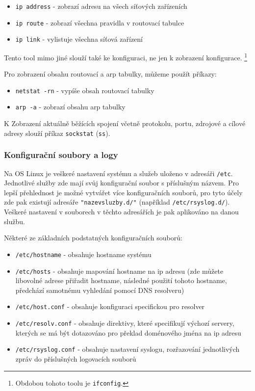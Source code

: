 \begin{itemize}
				\item \texttt{ip address} - zobrazí adresu na všech síťových zařízeních
				\item \texttt{ip route} - zobrazí všechna pravidla v routovací tabulce
				\item \texttt{ip link} - vylistuje všechna síťová zařízení
\end{itemize}

Tento tool mimo jiné slouží také ke konfiguraci, ne jen k zobrazení konfigurace. \footnote{Obdobou tohoto toolu je \texttt{ifconfig}.}


Pro zobrazení obsahu routovací a arp tabulky, můžeme použít příkazy:
\begin{itemize}
\item \texttt{netstat -rn} - vypíše obsah routovací tabulky
\item \texttt{arp -a} - zobrazí obsahu arp tabulky
\end{itemize}


K Zobrazení aktuálně běžících spojení včetně protokolu, portu, zdrojové a cílové adresy slouží příkaz \texttt{sockstat} (\texttt{ss}).

\subsubsection{Konfigurační soubory a logy}
Na OS Linux je veškeré nastavení systému a služeb uloženo v adresáři \texttt{/etc}. Jednotlivé služby zde mají svůj konfigurační soubor s příslušným názvem. Pro lepší přehlednost je možné vytvářet více konfiguračních souborů, pro tyto účely zde pak existují adresáře \texttt{"nazevsluzby.d/"} (například \texttt{/etc/rsyslog.d/}). Veškeré nastavení v souborech v těchto adresářích je pak aplikováno na danou službu.

Některé ze základních podstatných konfiguračních souborů:
\begin{itemize}
				\item \texttt{/etc/hostname} - obsahuje hostname systému
				\item \texttt{/etc/hosts} - obsahuje mapování hostname na ip adresu (zde můžete libovolné adrese přiřadit hostname, následné použití tohoto hostname, předchází samotnému vyhledání pomocí DNS resolveru)
				\item \texttt{/etc/host.conf} - obsahuje konfiguraci specifickou pro resolver
				\item \texttt{/etc/resolv.conf} - obsahuje direktivy, které specifikují výchozí servery, kterých se má být dotazováno pro překlad doménového jména na ip adresu
				\item \texttt{/etc/rsyslog.conf} - obsahuje nastavení syslogu, rozřazování jednotlivých zpráv do příslušných logovacích souborů
\end{itemize}


